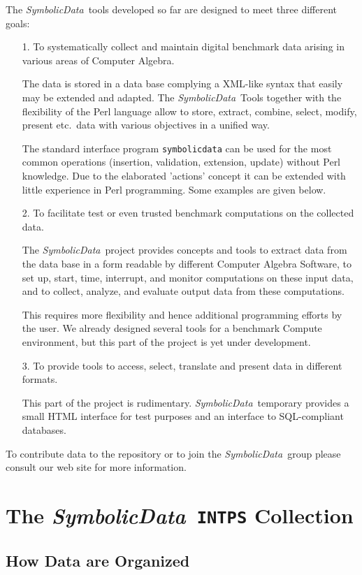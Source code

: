 \documentclass[11pt]{article}
\newcommand{\SD}{{\em Symbo\-lic\-Data}}
\begin{document}
The \SD\ tools developed so far are designed to meet three
different goals:
\begin{itemize}
\item[1.] To systematically collect and maintain digital
benchmark data arising in various areas of Computer Algebra.

The data is stored in a data base complying a XML-like syntax
that easily may be extended and adapted. The \SD\ Tools together
with the flexibility of the Perl language allow to store,
extract, combine, select, modify, present etc.\ data with various
objectives in a unified way.

The standard interface program {\tt symbolicdata} can be used for the
most common operations (insertion, validation, extension, update)
without Perl knowledge.  Due to the elaborated 'actions' concept it
can be extended with little experience in Perl programming.  Some
examples are given below. 

\item[2.] To facilitate test or even trusted benchmark
computations on the collected data.

The \SD\ project provides concepts and tools to extract data from
the data base in a form readable by different Computer Algebra
Software, to set up, start, time, interrupt, and monitor
computations on these input data, and to collect, analyze, and
evaluate output data from these computations.  

This requires more flexibility and hence additional programming
efforts by the user.  We already designed several tools for a
benchmark Compute environment, but this part of the project is yet
under development.

\item[3.] To provide tools to access, select, translate and
present data in different formats.

This part of the project is rudimentary. \SD\ temporary provides a
small HTML interface for test purposes and an interface to
SQL-compliant databases.
\end{itemize}

To contribute data to the repository or to join the \SD\ group
please consult our web site for more information.

\section{The \SD\ {\tt INTPS} Collection}

\subsection{How Data are Organized}
\end{document}
